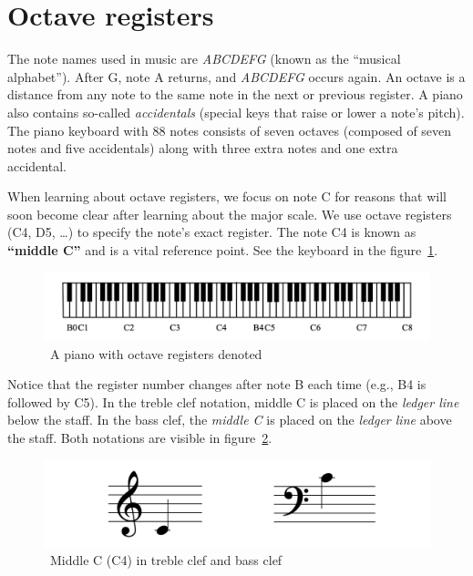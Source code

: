 \section{Octave registers}\label{sec:octave-registers}

The note names used in music are \textit{ABCDEFG} (known as the ``musical alphabet'').
After G, note A returns, and \textit{ABCDEFG} occurs again.
An octave is a distance from any note to the same note in the next or previous register.
A piano also contains so-called \textit{accidentals} (special keys that raise or lower a note's pitch).
The piano keyboard with 88 notes consists of seven octaves (composed of seven notes and five accidentals) along with three extra notes and one extra accidental.~\cite{music-theory}

When learning about octave registers, we focus on note C for reasons that will soon become clear after learning about the major scale.
We use octave registers (C4, D5, \ldots) to specify the note's exact register.
The note C4 is known as \textbf{``middle C''} and is a vital reference point.
See the keyboard in the figure~\ref{fig:octave-registers}.~\cite{music-theory}

\begin{figure}
    \centering
    \includegraphics[width=\textwidth]{assets/octave-registers}
    \caption{~A piano with octave registers denoted~\cite{music-theory}}\label{fig:octave-registers}
\end{figure}

Notice that the register number changes after note B each time (e.g., B4 is followed by C5).
In the treble clef notation, middle C is placed on the \textit{ledger line} below the staff.
In the bass clef, the \textit{middle C} is placed on the \textit{ledger line} above the staff.
Both notations are visible in figure~\ref{fig:middle-c}.~\cite{music-theory}

\begin{figure}
    \centering
    \includegraphics[width=\textwidth]{assets/middle-c}
    \caption{~Middle C (C4) in treble clef and bass clef~\cite{music-theory}}\label{fig:middle-c}
\end{figure}

